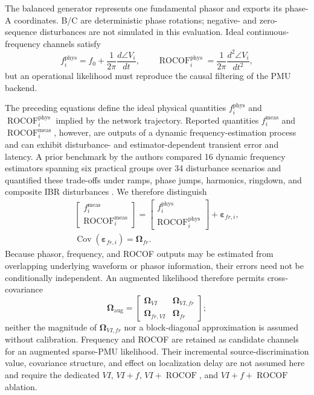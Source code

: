 \documentclass{ieeeaccess}
\begin{document}
The balanced generator represents one fundamental phasor and exports its phase-A coordinates. B/C are deterministic phase rotations; negative- and zero-sequence disturbances are not simulated in this evaluation. Ideal continuous-frequency channels satisfy
\begin{equation}
 f_i^{\mathrm{phys}}=f_0+\frac{1}{2\pi}\frac{d\angle V_i}{dt},\qquad
 \operatorname{ROCOF}_i^{\mathrm{phys}}=\frac{1}{2\pi}\frac{d^2\angle V_i}{dt^2},
\end{equation}
but an operational likelihood must reproduce the causal filtering of the PMU backend.

The preceding equations define the ideal physical quantities $f_i^{\mathrm{phys}}$ and $\operatorname{ROCOF}_i^{\mathrm{phys}}$ implied by the network trajectory. Reported quantities $f_i^{\mathrm{meas}}$ and $\operatorname{ROCOF}_i^{\mathrm{meas}}$, however, are outputs of a dynamic frequency-estimation process and can exhibit disturbance- and estimator-dependent transient error and latency. A prior benchmark by the authors compared 16 dynamic frequency estimators spanning six practical groups over 34 disturbance scenarios and quantified these trade-offs under ramps, phase jumps, harmonics, ringdown, and composite IBR disturbances \cite{Mayorga2026FrequencyBenchmark}. We therefore distinguish
\begin{equation}
 \begin{gathered}
 \begin{bmatrix}f_i^{\mathrm{meas}}\\\operatorname{ROCOF}_i^{\mathrm{meas}}\end{bmatrix}
 =
 \begin{bmatrix}f_i^{\mathrm{phys}}\\\operatorname{ROCOF}_i^{\mathrm{phys}}\end{bmatrix}
 +\bm\varepsilon_{fr,i},\\
 \operatorname{Cov}(\bm\varepsilon_{fr,i})=\bm\Omega_{fr}.
 \end{gathered}
\end{equation}
Because phasor, frequency, and ROCOF outputs may be estimated from overlapping underlying waveform or phasor information, their errors need not be conditionally independent. An augmented likelihood therefore permits cross-covariance
\begin{equation}
 \bm\Omega_{\mathrm{aug}}=
 \begin{bmatrix}
 \bm\Omega_{VI}&\bm\Omega_{VI,fr}\\
 \bm\Omega_{fr,VI}&\bm\Omega_{fr}
 \end{bmatrix};
\end{equation}
neither the magnitude of $\bm\Omega_{VI,fr}$ nor a block-diagonal approximation is assumed without calibration. Frequency and ROCOF are retained as candidate channels for an augmented sparse-PMU likelihood. Their incremental source-discrimination value, covariance structure, and effect on localization delay are not assumed here and require the dedicated $VI$, $VI+f$, $VI+\operatorname{ROCOF}$, and $VI+f+\operatorname{ROCOF}$ ablation.
\end{document}
